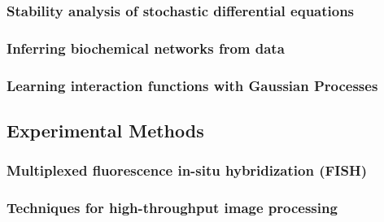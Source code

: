 \documentclass{article}
\begin{document}
\subsubsection{Stability analysis of stochastic differential equations}

\subsubsection{Inferring biochemical networks from data}

\subsubsection{Learning interaction functions with Gaussian Processes}

\subsection{Experimental Methods}

\subsubsection{Multiplexed fluorescence in-situ hybridization (FISH)}

\subsubsection{Techniques for high-throughput image processing}


\end{document}

